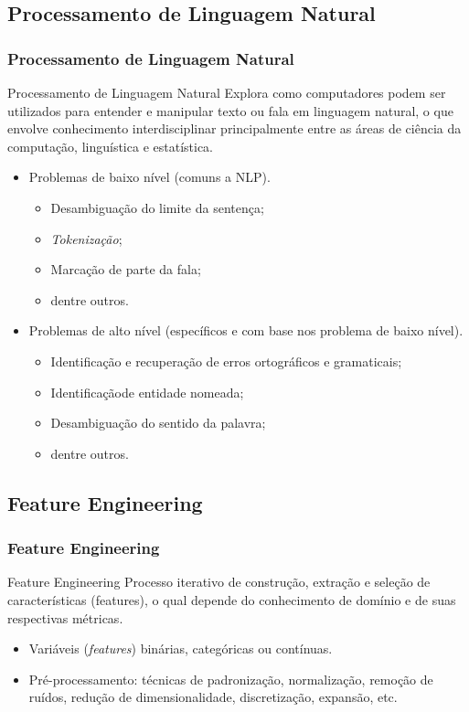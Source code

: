 \documentclass{beamer}
\begin{document}
\subsection{Processamento de Linguagem Natural}
\begin{frame}
\frametitle{Processamento de Linguagem Natural}
\begin{block}{{Processamento de Linguagem Natural}}
Explora como computadores podem ser utilizados para entender e manipular texto ou fala em linguagem natural, o que envolve conhecimento interdisciplinar principalmente entre as áreas de ciência da computação, linguística e estatística.
\end{block}
\begin{multicols}{2}
\begin{itemize}
\item Problemas de baixo nível (comuns a NLP).
\begin{itemize}
\item Desambiguação do limite da sentença;
\item \textit{Tokenização};
\item Marcação de parte da fala;
\item dentre outros.
\end{itemize}
\end{itemize}

\columnbreak

\begin{itemize}
\item Problemas de alto nível (específicos e com base nos problema de baixo nível).
\begin{itemize}
\item Identificação e recuperação de erros ortográficos  e gramaticais;
\item Identificaçãode entidade nomeada;
\item Desambiguação do sentido da palavra;
\item dentre outros.
\end{itemize}
\end{itemize}
\end{multicols}
\end{frame}
\subsection{Feature Engineering}
\begin{frame}
\frametitle{Feature Engineering}
\begin{block}{Feature Engineering}
Processo iterativo de construção, extração e seleção de características (features), o qual depende do conhecimento de domínio e de suas respectivas métricas.
\end{block}
\begin{itemize}
\item Variáveis (\textit{features}) binárias, categóricas ou contínuas.
\item Pré-processamento: técnicas de padronização, normalização, remoção de ruídos, redução de dimensionalidade, discretização, expansão, etc.
\end{itemize}
\end{frame}
\end{document}
